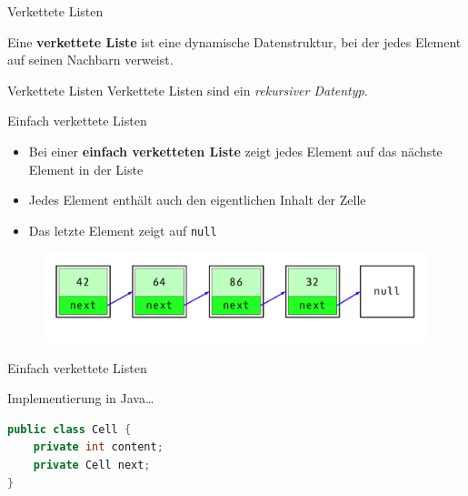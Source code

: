 \documentclass[18pt]{beamer}
\begin{document}
\begin{frame}{Verkettete Listen}
    \begin{block}{}
        Eine \textbf{verkettete Liste} ist eine dynamische Datenstruktur, bei der jedes Element auf seinen Nachbarn verweist.
    \end{block}

\end{frame}

\begin{frame}{Verkettete Listen}
    Verkettete Listen sind ein \textit{rekursiver Datentyp}.
\end{frame}

\begin{frame}{Einfach verkettete Listen}

    \begin{itemize}
        \item Bei einer \textbf{einfach verketteten Liste} zeigt jedes Element auf das nächste Element in der Liste
        \item Jedes Element enthält auch den eigentlichen Inhalt der Zelle
        \item Das letzte Element zeigt auf \texttt{null}
    \end{itemize}

    \begin{figure}
        \includegraphics[scale=.3]{img/simplelinkedlist.png}
    \end{figure}

\end{frame}

\begin{frame}[fragile]{Einfach verkettete Listen}

    Implementierung in Java\dots

    \begin{exampleblock}{}
        \begin{lstlisting}[language=Java]
public class Cell {
    private int content;
    private Cell next;
}
        \end{lstlisting}
    \end{exampleblock}

\end{frame}
\end{document}
